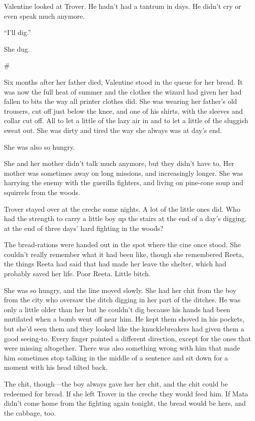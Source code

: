 Valentine looked at Trover. He hadn’t had a tantrum in days. He
didn’t cry or even speak much anymore.

“I’ll dig.”

She dug.

\#

Six months after her father died, Valentine stood in the queue for
her bread. It was now the full heat of summer and the clothes the
wizard had given her had fallen to bits the way all printer clothes
did. She was wearing her father’s old trousers, cut off just below
the knee, and one of his shirts, with the sleeves and collar cut
off. All to let a little of the lazy air in and to let a little of
the sluggish sweat out. She was dirty and tired the way she always
was at day’s end.

She was also so hungry.

She and her mother didn’t talk much anymore, but they didn’t have
to. Her mother was sometimes away on long missions, and
increasingly longer. She was harrying the enemy with the guerilla
fighters, and living on pine-cone soup and squirrels from the
woods.

Trover stayed over at the creche some nights. A lot of the little
ones did. Who had the strength to carry a little boy up the stairs
at the end of a day’s digging, at the end of three days’ hard
fighting in the woods?

The bread-rations were handed out in the spot where the cine once
stood. She couldn’t really remember what it had been like, though
she remembered Reeta, the things Reeta had said that had made her
leave the shelter, which had probably saved her life. Poor Reeta.
Little bitch.

She was so hungry, and the line moved slowly. She had her chit from
the boy from the city who oversaw the ditch digging in her part of
the ditches. He was only a little older than her but he couldn’t
dig because his hands had been mutilated when a bomb went off near
him. He kept them shoved in his pockets, but she’d seen them and
they looked like the knucklebreakers had given them a good
seeing-to. Every finger pointed a different direction, except for
the ones that were missing altogether. There was also something
wrong with him that made him sometimes stop talking in the middle
of a sentence and sit down for a moment with his head tilted back.

The chit, though—the boy always gave her her chit, and the chit
could be redeemed for bread. If she left Trover in the creche they
would feed him. If Mata didn’t come home from the fighting again
tonight, the bread would be hers, and the cabbage, too.

